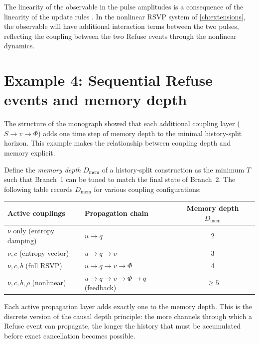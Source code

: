 \documentclass[12pt, oneside]{memoir}
\begin{document}
\begin{remark}
The linearity of the observable in the pulse amplitudes is a consequence of the
linearity of the update rules .  In the nonlinear RSVP
system of \cref{ch:extensions}, the observable will have additional interaction terms
between the two pulses, reflecting the coupling between the two Refuse events through
the nonlinear dynamics.
\end{remark}

\section{Example 4: Sequential Refuse events and memory depth}

The structure of the monograph showed that each additional coupling layer ($S \to v \to
\Phi$) adds one time step of memory depth to the minimal history-split horizon.  This
example makes the relationship between coupling depth and memory explicit.

\begin{example}
\label{ex:memory}
Define the \emph{memory depth} $D_{\mathrm{mem}}$ of a history-split construction as
the minimum $T$ such that Branch~1 can be tuned to match the final state of Branch~2.
The following table records $D_{\mathrm{mem}}$ for various coupling configurations:

\begin{center}
\begin{tabular}{llcc}
\toprule
Active couplings & Propagation chain & Memory depth $D_{\mathrm{mem}}$ \\
\midrule
$\nu$ only (entropy damping) & $u \to q$ & 2 \\
$\nu, c$ (entropy-vector) & $u \to q \to v$ & 3 \\
$\nu, c, b$ (full RSVP) & $u \to q \to v \to \Phi$ & 4 \\
$\nu, c, b, \rho$ (nonlinear) & $u \to q \to v \to \Phi \to q$ (feedback) & $\ge 5$ \\
\bottomrule
\end{tabular}
\end{center}

Each active propagation layer adds exactly one to the memory depth.  This is the discrete
version of the causal depth principle: the more channels through which a Refuse event can
propagate, the longer the history that must be accumulated before exact cancellation
becomes possible.
\end{example}
\end{document}
